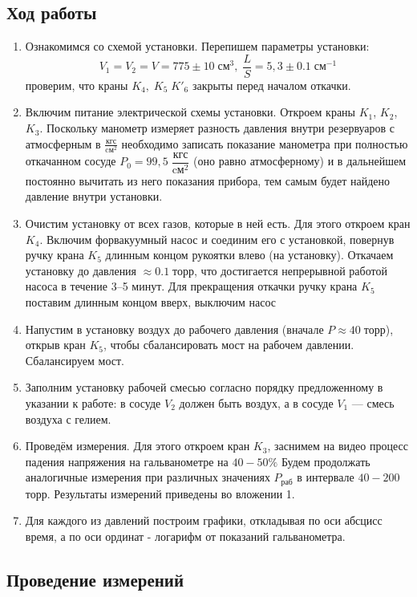 \documentclass[a4paper,12pt]{article} %
\begin{document}
\subsection{Ход работы}

\begin{enumerate}
\itemsep0em
\item Ознакомимся со схемой установки. Перепишем параметры установки: 
$$V_1 = V_2 = V = 775 \pm 10 \; \text{см}^{3}, \; \frac{L}{S} = 5,3 \pm 0.1 \; 
\text{см}^{-1}$$ 
проверим, что краны $K_4,\; K_5 \; K'_6$ закрыты перед началом откачки. 
\item Включим питание электрической схемы установки. Откроем краны $K_1$, $K_2$, $K_3$.
Поскольку манометр измеряет разность давления внутри резервуаров с атмосферным в $\frac{\text{кгс}}{\text{cм}^2}$ необходимо записать показание манометра при полностью откачанном сосуде $P_0 = 99,5 \;\dfrac{\text{кгс}}{\text{cм}^2}$ (оно равно атмосферному) и в дальнейшем постоянно вычитать из него показания прибора, тем самым будет найдено давление внутри установки.
\item Очистим установку от всех газов, которые в ней есть. Для этого откроем кран $K_4$. Включим форвакуумный насос  и соединим его с установкой, повернув ручку крана $K_5$ длинным концом рукоятки влево (на установку). Откачаем установку до давления $\approx 0.1 \; \text{торр} $, что достигается непрерывной работой насоса в течение 3–5 минут. Для прекращения откачки ручку крана $K_5$ поставим длинным концом вверх, выключим насос
\item  Напустим в установку воздух до рабочего давления (вначале $P \approx 40 \; \text{торр}$), открыв кран $K_5$, чтобы сбалансировать мост на рабочем давлении. Сбалансируем мост.
\item Заполним установку рабочей смесью согласно порядку предложенному в указании к работе: в сосуде $V_2$ должен быть воздух, а в сосуде $V_1$ — смесь воздуха с гелием.
\item Проведём измерения. Для этого откроем кран $K_3$, заснимем на видео процесс падения напряжения на гальванометре на $40 - 50\%$ Будем продолжать аналогичные измерения при различных значениях $P_\text{раб}$ в интервале $40 - 200$ торр. Результаты измерений приведены во вложении 1.
\item Для каждого из давлений построим графики, откладывая по
оси абсцисс время, а по оси ординат - логарифм от показаний гальванометра.
\end{enumerate}


\subsection{Проведение измерений}
\end{document}
